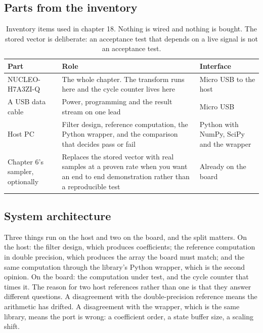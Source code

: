 \subsection*{Parts from the inventory}

\begin{table}[H]\centering\small
\begin{tabular}{p{40mm}p{66mm}p{40mm}}
\toprule
Part & Role & Interface \\
\midrule
NUCLEO-H7A3ZI-Q & The whole chapter. The transform runs here and the cycle counter lives here & Micro USB to the host \\
A USB data cable & Power, programming and the result stream on one lead & Micro USB \\
Host PC & Filter design, reference computation, the Python wrapper, and the comparison that decides pass or fail & Python with NumPy, SciPy and the wrapper \\
Chapter 6's sampler, optionally & Replaces the stored vector with real samples at a proven rate when you want an end to end demonstration rather than a reproducible test & Already on the board \\
\bottomrule
\end{tabular}
\caption{Inventory items used in chapter 18. Nothing is wired and nothing is bought. The stored vector is deliberate: an acceptance test that depends on a live signal is not an acceptance test.}
\end{table}

\subsection*{System architecture}


Three things run on the host and two on the board, and the split matters. On
the host: the filter design, which produces coefficients; the reference
computation in double precision, which produces the array the board must match;
and the same computation through the library's Python wrapper, which is the
second opinion. On the board: the computation under test, and the cycle counter
that times it. The reason for two host references rather than one is that they
answer different questions. A disagreement with the double-precision reference
means the arithmetic has drifted. A disagreement with the wrapper, which is the
same library, means the port is wrong: a coefficient order, a state buffer
size, a scaling shift.

